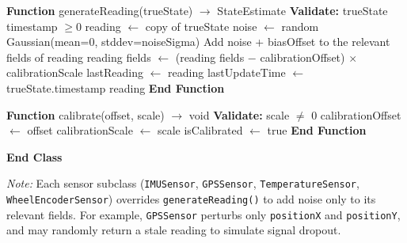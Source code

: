 \documentclass[a4paper,11pt]{article}
\begin{document}
\begin{algorithm}[H]
\begin{algorithmic}[1]
\vspace{0.2cm}
\State \hspace{1cm} \textbf{Function} generateReading(trueState) $\rightarrow$ StateEstimate
\State \hspace{1.5cm} \textbf{Validate:} trueState timestamp $\geq 0$
\State \hspace{1.5cm} reading $\leftarrow$ copy of trueState
\State \hspace{1.5cm} noise $\leftarrow$ random Gaussian(mean=0, stddev=noiseSigma)
\State \hspace{1.5cm} Add noise + biasOffset to the relevant fields of reading
\State \hspace{1.5cm} 
\State \hspace{2cm} reading fields $\leftarrow$ (reading fields $-$ calibrationOffset) $\times$ calibrationScale
\State \hspace{1.5cm} \EndIf
\State \hspace{1.5cm} lastReading $\leftarrow$ reading
\State \hspace{1.5cm} lastUpdateTime $\leftarrow$ trueState.timestamp
\State \hspace{1.5cm} \Return reading
\State \hspace{1cm} \textbf{End Function}

\vspace{0.2cm}
\State \hspace{1cm} \textbf{Function} calibrate(offset, scale) $\rightarrow$ void
\State \hspace{1.5cm} \textbf{Validate:} scale $\neq$ 0
\State \hspace{1.5cm} calibrationOffset $\leftarrow$ offset
\State \hspace{1.5cm} calibrationScale $\leftarrow$ scale
\State \hspace{1.5cm} isCalibrated $\leftarrow$ true
\State \hspace{1cm} \textbf{End Function}

\State \textbf{End Class}

\end{algorithmic}
\end{algorithm}

\noindent\textit{Note:} Each sensor subclass (\texttt{IMUSensor}, \texttt{GPSSensor}, \texttt{TemperatureSensor}, \texttt{WheelEncoderSensor}) overrides \texttt{generateReading()} to add noise only to its relevant fields. For example, \texttt{GPSSensor} perturbs only \texttt{positionX} and \texttt{positionY}, and may randomly return a stale reading to simulate signal dropout.
\end{document}
